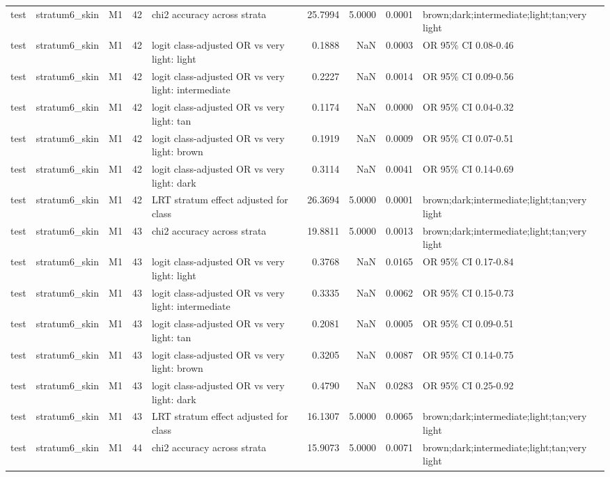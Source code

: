 \begin{tabular}{lllrlrrrl}
test & stratum6\_skin & M1 & 42 & chi2 accuracy across strata & 25.7994 & 5.0000 & 0.0001 & brown;dark;intermediate;light;tan;very light \\
test & stratum6\_skin & M1 & 42 & logit class-adjusted OR vs very light: light & 0.1888 & NaN & 0.0003 & OR 95\% CI 0.08-0.46 \\
test & stratum6\_skin & M1 & 42 & logit class-adjusted OR vs very light: intermediate & 0.2227 & NaN & 0.0014 & OR 95\% CI 0.09-0.56 \\
test & stratum6\_skin & M1 & 42 & logit class-adjusted OR vs very light: tan & 0.1174 & NaN & 0.0000 & OR 95\% CI 0.04-0.32 \\
test & stratum6\_skin & M1 & 42 & logit class-adjusted OR vs very light: brown & 0.1919 & NaN & 0.0009 & OR 95\% CI 0.07-0.51 \\
test & stratum6\_skin & M1 & 42 & logit class-adjusted OR vs very light: dark & 0.3114 & NaN & 0.0041 & OR 95\% CI 0.14-0.69 \\
test & stratum6\_skin & M1 & 42 & LRT stratum effect adjusted for class & 26.3694 & 5.0000 & 0.0001 & brown;dark;intermediate;light;tan;very light \\
test & stratum6\_skin & M1 & 43 & chi2 accuracy across strata & 19.8811 & 5.0000 & 0.0013 & brown;dark;intermediate;light;tan;very light \\
test & stratum6\_skin & M1 & 43 & logit class-adjusted OR vs very light: light & 0.3768 & NaN & 0.0165 & OR 95\% CI 0.17-0.84 \\
test & stratum6\_skin & M1 & 43 & logit class-adjusted OR vs very light: intermediate & 0.3335 & NaN & 0.0062 & OR 95\% CI 0.15-0.73 \\
test & stratum6\_skin & M1 & 43 & logit class-adjusted OR vs very light: tan & 0.2081 & NaN & 0.0005 & OR 95\% CI 0.09-0.51 \\
test & stratum6\_skin & M1 & 43 & logit class-adjusted OR vs very light: brown & 0.3205 & NaN & 0.0087 & OR 95\% CI 0.14-0.75 \\
test & stratum6\_skin & M1 & 43 & logit class-adjusted OR vs very light: dark & 0.4790 & NaN & 0.0283 & OR 95\% CI 0.25-0.92 \\
test & stratum6\_skin & M1 & 43 & LRT stratum effect adjusted for class & 16.1307 & 5.0000 & 0.0065 & brown;dark;intermediate;light;tan;very light \\
test & stratum6\_skin & M1 & 44 & chi2 accuracy across strata & 15.9073 & 5.0000 & 0.0071 & brown;dark;intermediate;light;tan;very light \\

\end{tabular}
